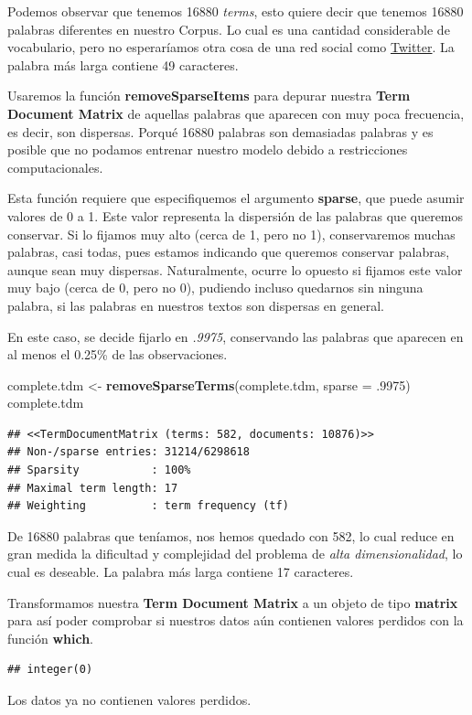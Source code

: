 \documentclass[]{article}
\newenvironment{Shaded}{\begin{snugshade}}{\end{snugshade}}
\newcommand{\DataTypeTok}[1]{\textcolor[rgb]{0.13,0.29,0.53}{#1}}
\newcommand{\FloatTok}[1]{\textcolor[rgb]{0.00,0.00,0.81}{#1}}
\newcommand{\KeywordTok}[1]{\textcolor[rgb]{0.13,0.29,0.53}{\textbf{#1}}}
\newcommand{\NormalTok}[1]{#1}
\newcommand{\StringTok}[1]{\textcolor[rgb]{0.31,0.60,0.02}{#1}}
\begin{document}
Podemos observar que tenemos 16880 \emph{terms}, esto quiere decir que
tenemos 16880 palabras diferentes en nuestro Corpus. Lo cual es una
cantidad considerable de vocabulario, pero no esperaríamos otra cosa de
una red social como \href{https://twitter.com}{Twitter}. La palabra más
larga contiene 49 caracteres.

Usaremos la función \textbf{removeSparseItems} para depurar nuestra
\textbf{Term Document Matrix} de aquellas palabras que aparecen con muy
poca frecuencia, es decir, son dispersas. Porqué 16880 palabras son
demasiadas palabras y es posible que no podamos entrenar nuestro modelo
debido a restricciones computacionales.

Esta función requiere que especifiquemos el argumento \textbf{sparse},
que puede asumir valores de 0 a 1. Este valor representa la dispersión
de las palabras que queremos conservar. Si lo fijamos muy alto (cerca de
1, pero no 1), conservaremos muchas palabras, casi todas, pues estamos
indicando que queremos conservar palabras, aunque sean muy dispersas.
Naturalmente, ocurre lo opuesto si fijamos este valor muy bajo (cerca de
0, pero no 0), pudiendo incluso quedarnos sin ninguna palabra, si las
palabras en nuestros textos son dispersas en general.

En este caso, se decide fijarlo en \emph{.9975}, conservando las
palabras que aparecen en al menos el 0.25\% de las observaciones.

\begin{Shaded}
\begin{Highlighting}[]
\NormalTok{complete.tdm <-}\StringTok{ }\KeywordTok{removeSparseTerms}\NormalTok{(complete.tdm, }\DataTypeTok{sparse =} \FloatTok{.9975}\NormalTok{)}
\NormalTok{complete.tdm}
\end{Highlighting}
\end{Shaded}

\begin{verbatim}
## <<TermDocumentMatrix (terms: 582, documents: 10876)>>
## Non-/sparse entries: 31214/6298618
## Sparsity           : 100%
## Maximal term length: 17
## Weighting          : term frequency (tf)
\end{verbatim}

De 16880 palabras que teníamos, nos hemos quedado con 582, lo cual
reduce en gran medida la dificultad y complejidad del problema de
\emph{alta dimensionalidad}, lo cual es deseable. La palabra más larga
contiene 17 caracteres.

Transformamos nuestra \textbf{Term Document Matrix} a un objeto de tipo
\textbf{matrix} para así poder comprobar si nuestros datos aún contienen
valores perdidos con la función \textbf{which}.

\begin{verbatim}
## integer(0)
\end{verbatim}

Los datos ya no contienen valores perdidos.
\end{document}

